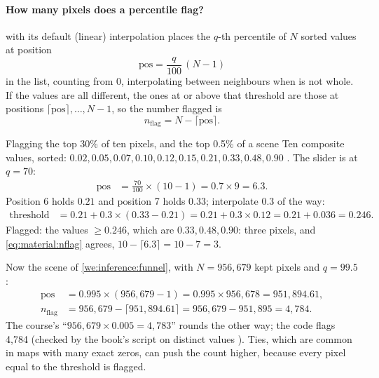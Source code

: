 \paragraph{How many pixels does a percentile flag?}  with its default (linear)
interpolation places the $q$-th percentile of $N$ sorted values at position
\begin{equation}
\text{pos}=\frac{q}{100}\,(N-1)
\end{equation}
in the list, counting from 0, interpolating between neighbours when  is not whole. If the values are
all different, the ones at or above that threshold are those at positions $\lceil\text{pos}\rceil,\dots,N-1$,
so the number flagged is
\begin{equation}
n_{\text{flag}}=N-\lceil\text{pos}\rceil.
\label{eq:material:nflag}
\end{equation}

\begin{worked}[label={we:material:percentile}]{Flagging the top 30\% of ten pixels, and the top 0.5\% of a scene}
Ten composite values, sorted: $0.02, 0.05, 0.07, 0.10, 0.12, 0.15, 0.21, 0.33, 0.48, 0.90$ \tagA. The slider is
at $q=70$:
\begin{align*}
\text{pos} &= \frac{70}{100}\times(10-1) = 0.7\times9 = 6.3.
\end{align*}
Position 6 holds $0.21$ and position 7 holds $0.33$; interpolate $0.3$ of the way:
\begin{align*}
\text{threshold} &= 0.21+0.3\times(0.33-0.21) = 0.21+0.3\times0.12 = 0.21+0.036 = 0.246.
\end{align*}
Flagged: the values $\ge0.246$, which are $0.33, 0.48, 0.90$: three pixels, and
\cref{eq:material:nflag} agrees, $10-\lceil6.3\rceil=10-7=3$.

Now the scene of \cref{we:inference:funnel}, with $N=956{,}679$ kept pixels and $q=99.5$:
\begin{align*}
\text{pos} &= 0.995\times(956{,}679-1) = 0.995\times956{,}678 = 951{,}894.61,\\
n_{\text{flag}} &= 956{,}679-\lceil951{,}894.61\rceil = 956{,}679-951{,}895 = 4{,}784.
\end{align*}
The course's ``$956{,}679\times0.005=4{,}783$'' rounds the other way; the code flags 4,784 (checked by the
book's script on distinct values \tagC). Ties, which are common in maps with many exact zeros, can push the
count higher, because every pixel equal to the threshold is flagged.
\end{worked}

